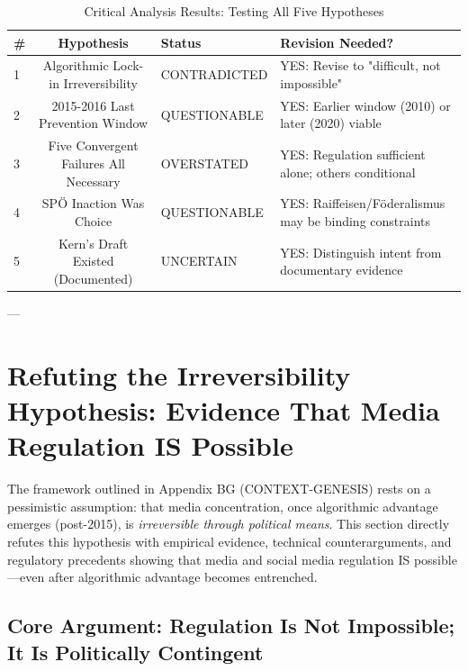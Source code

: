 \begin{table}[h]
\centering
\small
\caption{Critical Analysis Results: Testing All Five Hypotheses}
\label{tab:critical-analysis}
\begin{tabular}{|l|c|l|l|}
\hline
\textbf{\#} & \textbf{Hypothesis} & \textbf{Status} & \textbf{Revision Needed?} \\
\hline
1 & Algorithmic Lock-in Irreversibility & CONTRADICTED & YES: Revise to "difficult, not impossible" \\
\hline
2 & 2015-2016 Last Prevention Window & QUESTIONABLE & YES: Earlier window (2010) or later (2020) viable \\
\hline
3 & Five Convergent Failures All Necessary & OVERSTATED & YES: Regulation sufficient alone; others conditional \\
\hline
4 & SPÖ Inaction Was Choice & QUESTIONABLE & YES: Raiffeisen/Föderalismus may be binding constraints \\
\hline
5 & Kern's Draft Existed (Documented) & UNCERTAIN & YES: Distinguish intent from documentary evidence \\
\hline
\end{tabular}
\end{table}

---


\section*{Refuting the Irreversibility Hypothesis: Evidence That Media Regulation IS Possible}

The framework outlined in Appendix BG (CONTEXT-GENESIS) rests on a pessimistic assumption: that media concentration, once algorithmic advantage emerges (post-2015), is \textit{irreversible through political means}. This section directly refutes this hypothesis with empirical evidence, technical counterarguments, and regulatory precedents showing that media and social media regulation IS possible—even after algorithmic advantage becomes entrenched.

\subsection*{Core Argument: Regulation Is Not Impossible; It Is Politically Contingent}

